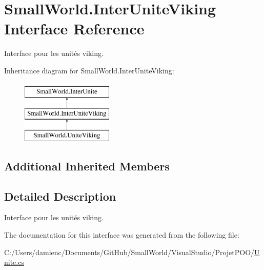 \hypertarget{interface_small_world_1_1_inter_unite_viking}{\section{Small\-World.\-Inter\-Unite\-Viking Interface Reference}
\label{interface_small_world_1_1_inter_unite_viking}
}


Interface pour les unités viking.  


Inheritance diagram for Small\-World.\-Inter\-Unite\-Viking\-:\begin{figure}[H]
\begin{center}
\leavevmode
\includegraphics[height=3.000000cm]{interface_small_world_1_1_inter_unite_viking}
\end{center}
\end{figure}
\subsection*{Additional Inherited Members}


\subsection{Detailed Description}
Interface pour les unités viking. 

The documentation for this interface was generated from the following file\-:\begin{DoxyCompactItemize}
\item 
C\-:/\-Users/damienc/\-Documents/\-Git\-Hub/\-Small\-World/\-Visual\-Studio/\-Projet\-P\-O\-O/\hyperlink{_unite_8cs}{Unite.\-cs}\end{DoxyCompactItemize}
